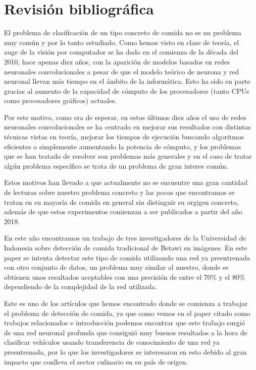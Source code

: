 \section{Revisión bibliográfica}

El problema de clasificación de un tipo concreto de comida no es un problema muy común y por lo tanto estudiado. Como hemos visto en clase de teoría, el auge de la visión por computador se ha dado en el comienzo de la década del 2010, hace apenas diez años, con la aparición de modelos basados en redes neuronales convolucionales a pesar de que el modelo teórico de neurona y red neuronal llevan más tiempo en el ámbito de la informática. Esto ha sido en parte gracias al aumento de la capacidad de cómputo de los procesadores (tanto CPUs como procesadores gráficos) actuales.

Por este motivo, como era de esperar, en estos últimos diez años el uso de redes neuronales convolucionales se ha centrado en mejorar sus resultados con distintas técnicas vistas en teoría, mejorar los tiempos de ejecución buscando algoritmos eficientes o simplemente aumentando la potencia de cómputo, y los problemas que se han tratado de resolver son problemas más generales y en el caso de tratar algún problema específico se trata de un problema de gran interes común.

Estos motivos han llevado a que actualmente no se encuentre una gran cantidad de lecturas sobre nuestro problema concreto y las pocas que encontramos se tratan en su mayoría de comida en general sin distinguir su orgigen concreto, además de que estos experimentos comienzan a ser publicados a partir del año 2018.


En este año encontramos un trabajo de tres investigadores de la Universidad de Indonesia sobre detección de comida tradicional de Betawi en imágenes\cite{betawiFood}. En este paper se intenta detectar este tipo de comida utilizando una red ya preentrenada con otro conjunto de datos, un problema muy similar al nuestro, donde se obtienen unos resultados aceptables con una precisión de entre el 70\% y el 80\% dependiendo de la complejidad de la red utilizada.

Este es uno de los artículos que hemos encontrado donde se comienza a trabajar el problema de detección de comida, ya que como vemos en el paper citado como trabajos relacionados e introducción podemos encontrar que este trabajo surgió de una red neuronal profunda que consiguió muy buenos resultados a la hora de clasificar vehículos usando transferencia de conocimiento de una red ya preentrenada, por lo que los investigadores se interesaron en esto debido al gran impacto que conlleva el sector culinario en su país de origen.

